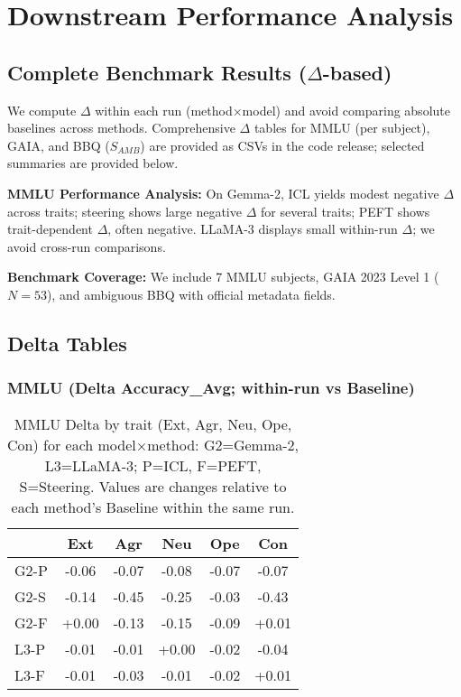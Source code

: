 \section{Downstream Performance Analysis}
\label{app:downstream-analysis}

\subsection{Complete Benchmark Results (\(\Delta\)-based)}

We compute \(\Delta\) within each run (method×model) and avoid comparing absolute baselines across methods. Comprehensive \(\Delta\) tables for MMLU (per subject), GAIA, and BBQ (\(S_{AMB}\)) are provided as CSVs in the code release; selected summaries are provided below.

\textbf{MMLU Performance Analysis:} On Gemma-2, ICL yields modest negative \(\Delta\) across traits; steering shows large negative \(\Delta\) for several traits; PEFT shows trait-dependent \(\Delta\), often negative. LLaMA-3 displays small within-run \(\Delta\); we avoid cross-run comparisons.

\textbf{Benchmark Coverage:} We include 7 MMLU subjects, GAIA 2023 Level 1 (\(N=53\)), and ambiguous BBQ with official metadata fields.

\subsection{Delta Tables}
\FloatBarrier

\subsubsection{MMLU (Delta Accuracy\_Avg; within-run vs Baseline)}
\begin{table}[H]
\centering
\scriptsize
{\setlength{\tabcolsep}{2pt}\renewcommand{\arraystretch}{0.95}%
\begin{adjustbox}{max width=\linewidth}
\begin{tabular}{lSSSSS}
\toprule
& {Ext} & {Agr} & {Neu} & {Ope} & {Con} \\
\midrule
G2-P & -0.06 & -0.07 & -0.08 & -0.07 & -0.07 \\
G2-S & -0.14 & -0.45 & -0.25 & -0.03 & -0.43 \\
G2-F & +0.00 & -0.13 & -0.15 & -0.09 & +0.01 \\
L3-P & -0.01 & -0.01 & +0.00 & -0.02 & -0.04 \\
L3-F & -0.01 & -0.03 & -0.01 & -0.02 & +0.01 \\
\bottomrule
\end{tabular}
\end{adjustbox}}
\caption{MMLU Delta by trait (Ext, Agr, Neu, Ope, Con) for each model×method: G2=Gemma-2, L3=LLaMA-3; P=ICL, F=PEFT, S=Steering. Values are changes relative to each method's Baseline within the same run.}
\label{tab:delta-mmlu}
\end{table}
\FloatBarrier

